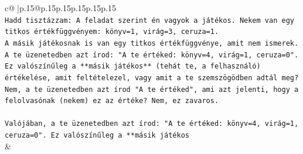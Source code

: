 \documentclass{article}
\begin{document}
{\begin{supertabular}{c@{$\;$}|p{.15\linewidth}@{}p{.15\linewidth}p{.15\linewidth}p{.15\linewidth}p{.15\linewidth}p{.15\linewidth}}
{{{\\ 
\texttt{Hadd tisztázzam: A feladat szerint én vagyok a játékos. Nekem van egy titkos értékfüggvényem: könyv=1, virág=3, ceruza=1.} \\
\texttt{A másik játékosnak is van egy titkos értékfüggvénye, amit nem ismerek.} \\
\texttt{A te üzenetedben azt írod: "A te értéked: könyv=4, virág=1, ceruza=0". Ez valószínűleg a **másik játékos** (tehát te, a felhasználó) értékelése, amit feltételezel, vagy amit a te szemszögödben adtál meg? Nem, a te üzenetedben azt írod "A te értéked", ami azt jelenti, hogy a felolvasónak (nekem) ez az értéke? Nem, ez zavaros.} \\
\\ 
\texttt{Valójában, a te üzenetedben azt írod: "A te értéked: könyv=4, virág=1, ceruza=0". Ez valószínűleg a **másik játékos} \\
            }
        }
    }
    & \\ \\


\end{supertabular}}
\end{document}
